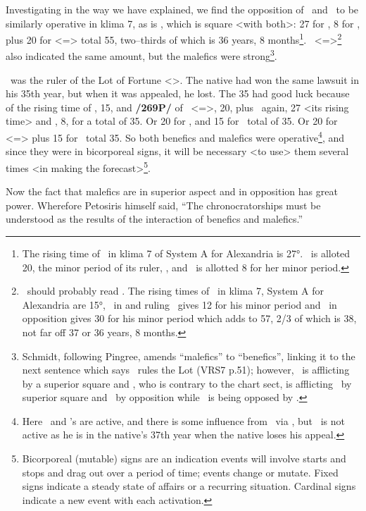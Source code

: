 Investigating in the way we have explained, we find the opposition of \Mars\, and \Venus\, to be similarly operative in klima
7, as is \Saturn, which is square <with both>: 27 for \Gemini, 8 for \Venus, plus 20 for \Virgo <=\Mercury> total 55, two--thirds of which is 36 years, 8 months\footnote{The rising time of \Gemini\, in klima 7 of System A for Alexandria is 27°. \Virgo\, is alloted 20, the minor period of its ruler, \Mercury, and \Venus\, is allotted 8 for her minor period.}. \Pisces\, <=\Saturn>\footnote{\Saturn\, should probably read \Jupiter. The rising times of \Pisces\, in klima 7, System A for Alexandria are 15°, \Jupiter\, in and ruling \Pisces\, gives 12 for his minor period and \Saturn\, in opposition gives 30 for his minor period which adds to 57, 2/3 of which is 38, not far off 37 or 36 years, 8 months.} also indicated the same amount, but the malefics were strong\footnote{Schmidt, following Pingree, amends ``malefics'' to ``benefics'', linking it to the next sentence which says \Venus\, rules the Lot (VRS7 p.51); however, \Saturn\, is afflicting \Mars\, by a superior square and \Mars, who is contrary to the chart sect, is afflicting \Jupiter\, by superior square and \Venus\, by opposition while \Jupiter\, is being opposed by \Saturn.}. 

\Venus\, was the ruler of the Lot of Fortune <\Libra>. The native had won the same lawsuit in his 35th year, but when it was appealed, he lost. The 35 had good luck because of the rising time of \Pisces, 15, and \textbf{/269P/} of \Gemini\, <=\Mercury>, 20, plus \Gemini\, again, 27 <its rising time> and \Venus, 8, for a total of 35. Or 20 for \Gemini, and 15 for \Mars\, total of 35. Or 20 for \Virgo\, <=\Mercury> plus 15 for \Mars\, total 35. So both benefics and malefics were operative\footnote{Here \Venus\, and \Mars's are active, and there is some influence from \Jupiter\, via \Pisces, but \Saturn\, is not active as he is in the native's 37th year when the native loses his appeal.}, and since they were in bicorporeal signs, it will be necessary <to use> them several times <in making the forecast>\footnote{Bicorporeal (mutable) signs are an indication events will involve starts and stops and drag out over a period of time; events change or mutate. Fixed signs indicate a steady state of affairs or a recurring situation. Cardinal signs indicate a new event with each activation.}. 

Now \mndl the fact that malefics are in superior aspect and in opposition has great power. Wherefore Petosiris himself said, “The chronocratorships must be understood as the results of the interaction of benefics and malefics.” 

